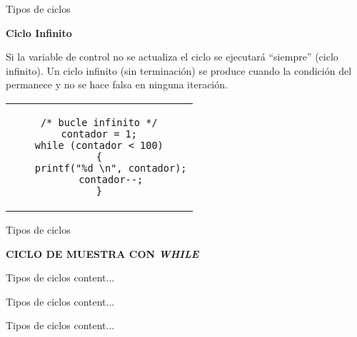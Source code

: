 \begin{frame}[fragile]{Tipos de ciclos}
    \begin{center}
        \textbf{Ciclo Infinito}
    \end{center}
    \justify
    Si la variable de control no se actualiza el ciclo se ejecutará “siempre” (ciclo infinito). Un ciclo infinito (sin terminación) se produce cuando la condición del permanece y no se hace falsa en ninguna iteración.
    \vspace{-2mm}
\begin{center}
    \begin{tabular}{c}
            \begin{lstlisting}
/* bucle infinito */
contador = 1;
while (contador < 100)
{
    printf("%d \n", contador);
    contador--;
}
\end{lstlisting}
    \end{tabular}
\end{center}
\end{frame}



\begin{frame}[fragile]{Tipos de ciclos}
\begin{center}
    \textbf{CICLO DE MUESTRA CON \textit{WHILE}}
\end{center}

\end{frame}



\begin{frame}{Tipos de ciclos}
content...
\end{frame}



\begin{frame}{Tipos de ciclos}
content...
\end{frame}



\begin{frame}{Tipos de ciclos}
content...
\end{frame}